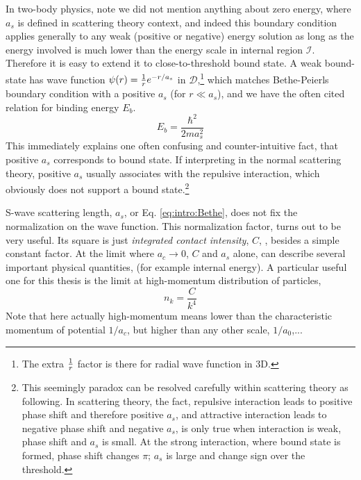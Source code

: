 In two-body physics, note we did not mention anything about zero energy, where $a_{s}$ is defined in scattering theory context, and indeed this boundary condition applies generally to  any weak (positive or negative) energy solution as long as the energy involved is much lower than the energy scale in internal region $\mathcal{I}$.  Therefore it is easy to extend it to close-to-threshold bound state.  A weak bound-state has wave function $\psi(r)=\frac{1}{r}e^{-r/a_s}$ in $\mathcal{D}$,\footnote{The extra $\frac{1}{r}$ factor is there for  radial wave function in 3D.} which matches Bethe-Peierls boundary condition with a positive $a_{s}$ (for  $r\ll{}a_{s}$), and we have the often cited relation for binding energy $E_{b}$.
\begin{equation}
 E_{b}=\frac{\hbar^{2}}{2ma_{s}^{2}}
\end{equation}
  This immediately explains one often confusing and counter-intuitive fact, that positive  $a_s$ corresponds to bound state.  If interpreting in the normal scattering theory, positive $a_s$  usually associates with the repulsive interaction, which obviously does not support a bound state.\footnote{This seemingly paradox can be resolved carefully within scattering theory as following. In scattering theory, the fact,  repulsive interaction leads to positive phase shift and therefore positive $a_s$, and attractive interaction leads to negative phase shift and negative $a_s$, is only true when interaction is weak, phase shift and $a_s$ is small.  At the strong interaction, where bound state is formed, phase shift changes $\pi$; $a_s$ is large and  change sign over the threshold. }

 S-wave scattering length, $a_s$, or Eq. \ref{eq:intro:Bethe}, does not fix the normalization on the wave function. This normalization factor, turns out to be very useful.  Its square is just \emph{integrated contact intensity}, $C$, \cite{ Tan2008-1,Tan2008-2,CombescotTan}, besides a simple constant factor.  At the limit where $a_c\to0$, $C$ and $a_s$ alone, can describe several important physical quantities, (for example internal energy).  A particular useful one for this thesis is the limit at high-momentum distribution of particles, 
 \begin{equation}
 n_k=\frac{C}{k^4}
 \end{equation}
 Note that here actually high-momentum means lower than the characteristic momentum of potential $1/a_c$, but higher than any other scale, $1/a_0$,...
 

